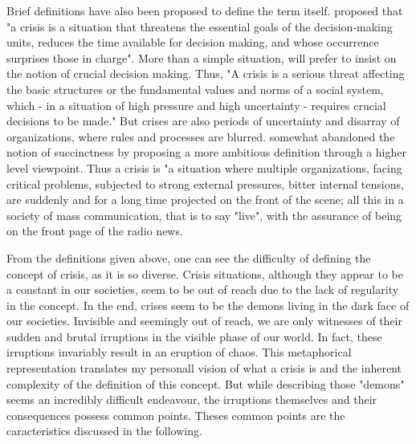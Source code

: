 Brief definitions have also been proposed to define the term itself.
\textcite{hermannIssuesStudyInternational1972} proposed that "a crisis is a situation that threatens the essential goals of the decision-making units,
reduces the time available for decision making, and whose occurrence surprises those in charge".
More than a simple situation, \cite{rosenthalCrisisDecisionMakingNetherlands1986} will prefer to insist on the notion of crucial decision making.
Thus, "A crisis is a serious threat affecting the basic structures or the fundamental values and norms of a social system,
which - in a situation of high pressure and high uncertainty - requires crucial decisions to be made."
But crises are also periods of uncertainty and disarray of organizations, where rules and processes are blurred.
\cite{lagadecGESTIONCRISES1994} somewhat abandoned the notion of succinctness by proposing a more ambitious definition through a higher level viewpoint.
Thus a crisis is "a situation where multiple organizations, facing critical problems, subjected to strong external pressures, bitter internal tensions, are suddenly and for a long time projected on the front of the scene;
all this in a society of mass communication, that is to say "live", with the assurance of being on the front page of the radio news.

From the definitions given above, one can see the difficulty of defining the concept of crisis, as it is so diverse.
Crisis situations, although they appear to be a constant in our societies, seem to be out of reach due to the lack of regularity in the concept.
In the end, crises seem to be the demons living in the dark face of our societies.
Invisible and seemingly out of reach, we are only witnesses of their sudden and brutal irruptions in the visible phase of our world.
In fact, these irruptions invariably result in an eruption of chaos.
This metaphorical representation translates my personall vision of what a crisis is and the inherent complexity of the definition of this concept.
But while describing those "demons" seems an incredibly difficult endeavour, the irruptions themselves and their consequences possess common points.
Theses common points are the caracteristics discussed in the following.

